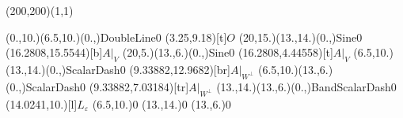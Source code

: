 \unitlength=1bp%

\begin{feynartspicture}(200,200)(1,1)

\FADiagram{}
\FAProp(0.,10.)(6.5,10.)(0.,){DoubleLine}{0}
\FALabel(3.25,9.18)[t]{$O$}
\FAProp(20,15.)(13.,14.)(0.,){Sine}{0}
\FALabel(16.2808,15.5544)[b]{$A|_V$}
\FAProp(20,5.)(13.,6.)(0.,){Sine}{0}
\FALabel(16.2808,4.44558)[t]{$A|_V$}
\FAProp(6.5,10.)(13.,14.)(0.,){ScalarDash}{0}
\FALabel(9.33882,12.9682)[br]{$A|_{W^\perp}$}
\FAProp(6.5,10.)(13.,6.)(0.,){ScalarDash}{0}
\FALabel(9.33882,7.03184)[tr]{$A|_{W^\perp}$}
\FAProp(13.,14.)(13.,6.)(0.,){BandScalarDash}{0}
\FALabel(14.0241,10.)[l]{$L_\varepsilon$}
\FAVert(6.5,10.){0}
\FAVert(13.,14.){0}
\FAVert(13.,6.){0}
\end{feynartspicture}

